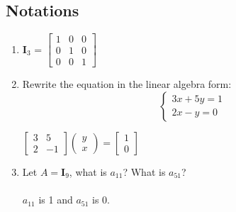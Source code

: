 \documentclass{assignment}
\begin{document}
\begin{problem}
\subsection{Notations}
\begin{enumerate}
    \item $\mathbf{I}_3$ = 
    $\begin{bmatrix}1 & 0 & 0 \\ 0 & 1 & 0 \\ 0 & 0 & 1\end{bmatrix}$
    \item Rewrite the equation in the linear algebra form:
    \begin{equation}
        \begin{cases}
        3x + 5y = 1 \\
        2x - y = 0   
        \end{cases} 
    \end{equation}

    $\begin{bmatrix}3 & 5 \\ 2 & -1\end{bmatrix} \begin{pmatrix} y \\ x\end{pmatrix}  = \begin{bmatrix} 1 \\ 0\end{bmatrix} $
    \item Let $A = \mathbf{I}_9$, what is $a_{11}$? What is $a_{51}$?\\\\
    $a_{11}$ is 1 and $a_{51}$ is 0.
    
\end{enumerate}


\end{problem}
\end{document}
